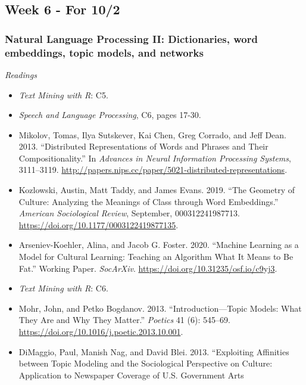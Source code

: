 \documentclass[
  10pt,
]{article}
\providecommand{\tightlist}{%
  \setlength{\itemsep}{0pt}\setlength{\parskip}{0pt}}
\begin{document}
\hypertarget{week-6---for-102}{%
\subsection{Week 6 - For 10/2}\label{week-6---for-102}}

\hypertarget{natural-language-processing-ii-dictionaries-word-embeddings-topic-models-and-networks}{%
\subsubsection{Natural Language Processing II: Dictionaries, word
embeddings, topic models, and
networks}\label{natural-language-processing-ii-dictionaries-word-embeddings-topic-models-and-networks}}

\emph{Readings}

\begin{itemize}
\tightlist
\item
  \emph{Text Mining with R}: C5.
\item
  \emph{Speech and Language Processing}, C6, pages 17-30.
\item
  Mikolov, Tomas, Ilya Sutskever, Kai Chen, Greg Corrado, and Jeff Dean.
  2013. ``Distributed Representations of Words and Phrases and Their
  Compositionality.'' In \emph{Advances in Neural Information Processing
  Systems}, 3111--3119.
  \url{http://papers.nips.cc/paper/5021-distributed-representations}.
\item
  Kozlowski, Austin, Matt Taddy, and James Evans. 2019. ``The Geometry
  of Culture: Analyzing the Meanings of Class through Word Embeddings.''
  \emph{American Sociological Review}, September, 000312241987713.
  \url{https://doi.org/10.1177/0003122419877135}.
\item
  Arseniev-Koehler, Alina, and Jacob G. Foster. 2020. ``Machine Learning
  as a Model for Cultural Learning: Teaching an Algorithm What It Means
  to Be Fat.'' Working Paper. \emph{SocArXiv}.
  \url{https://doi.org/10.31235/osf.io/c9yj3}.
\item
  \emph{Text Mining with R}: C6.
\item
  Mohr, John, and Petko Bogdanov. 2013. ``Introduction---Topic Models:
  What They Are and Why They Matter.'' \emph{Poetics} 41 (6): 545--69.
  \url{https://doi.org/10.1016/j.poetic.2013.10.001}.
\item
  DiMaggio, Paul, Manish Nag, and David Blei. 2013. ``Exploiting
  Affinities between Topic Modeling and the Sociological Perspective on
  Culture: Application to Newspaper Coverage of U.S. Government Arts

\end{itemize}
\end{document}
